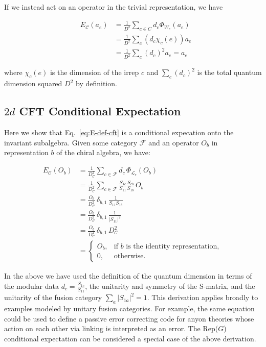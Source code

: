 \documentclass{article}
\newcommand{\mC}{\mathcal{C}}
\theoremstyle{definition}
\begin{document}
  If we instead act on an operator in the trivial representation, we have

  \begin{eqnarray}
    &E_{\mC}(a_e)&=\frac{1}{D^{2}}\sum_{c\in C}d_c\Phi_{W_c}(a_e)\\
    &&= \frac{1}{D^{2}}\sum_c (d_c \chi_c(e)) a_e\\
    &&= \frac{1}{D^{2}}\sum_c (d_c)^2 a_e = a_e
  \end{eqnarray}

  where $\chi_{c}(e)$ is the dimension of the irrep $c$ and $\sum_{c}(d_{c})^{2}$
  is the total quantum dimension squared $D^{2}$ by definition.

  \subsection{$2d$ CFT Conditional Expectation}
  \label{sec:condexpcft}

  Here we show that Eq.~\ref{eq:E-def-cft} is a conditional expecation onto the invariant
  subalgebra. Given some category $\mathcal{F}$ and an operator $O_{b}$ in
  representation $b$ of the chiral algebra, we have:

  \begin{align}
    E_{\mathcal{C}}(O_{b}) & = \frac{1}{D_{\mathcal{C}}^{2}}\sum_{c\in \mathcal{F}}d_{c}\,\Phi_{\mathcal{L_c}}(O_{b})                \\
                           & = \frac{1}{D_{\mathcal{C}}^{2}}\sum_{c\in \mathcal{F}}\frac{S_{1c}}{S_{11}}\frac{S_{cb}}{S_{1b}}\,O_{b} \\
                           & = \frac{O_{b}}{D_{\mathcal{C}}^{2}}\,\delta_{b,1}\,\frac{1}{S_{11}S_{1b}}                               \\
                           & = \frac{O_{b}}{D_{\mathcal{C}}^{2}}\,\delta_{b,1}\,\frac{1}{|S_{11}|^{2}}                               \\
                           & = \frac{O_{b}}{D_{\mathcal{C}}^{2}}\,\delta_{b,1}\,D_{\mathcal{C}}^{2}                                  \\
                           & = \begin{cases}O_{b},&\text{if $b$ is the identity representation},\\ 0,&\text{otherwise}.\end{cases}
  \end{align}

  In the above we have used the definition of the quantum dimension in terms of
  the modular data $d_{c}= \frac{S_{1c}}{S_{11}}$, the unitarity and symmetry of
  the S-matrix, and the unitarity of the fusion category
  $\sum_{a}|S_{1a}|^{2}= 1$. This derivation applies broadly to examples modeled
  by unitary fusion categories. For example, the same equation could be used to define
  a passive error correcting code for anyon theories whose action on each other via
  linking is interpreted as an error. The Rep($G$) conditional expectation can be
  considered a special case of the above derivation.
\end{document}
